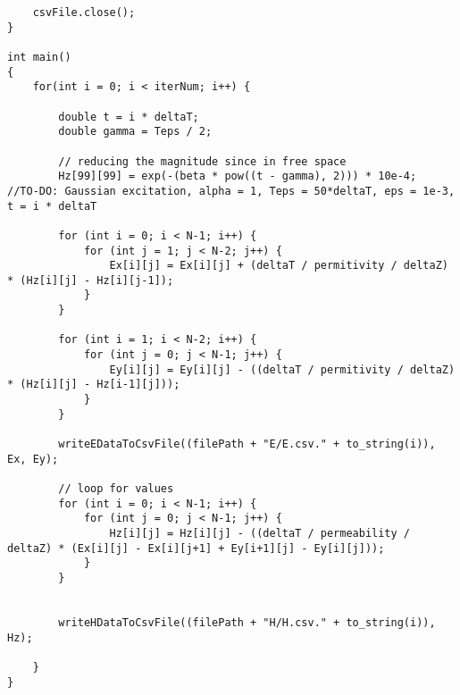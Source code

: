 \begin{verbatim}
	csvFile.close();
}

int main()
{
	for(int i = 0; i < iterNum; i++) {
		
		double t = i * deltaT;
		double gamma = Teps / 2;
		
		// reducing the magnitude since in free space
		Hz[99][99] = exp(-(beta * pow((t - gamma), 2))) * 10e-4;  //TO-DO: Gaussian excitation, alpha = 1, Teps = 50*deltaT, eps = 1e-3, t = i * deltaT
		
		for (int i = 0; i < N-1; i++) {
			for (int j = 1; j < N-2; j++) {
				Ex[i][j] = Ex[i][j] + (deltaT / permitivity / deltaZ) * (Hz[i][j] - Hz[i][j-1]);
			}
		}
		
		for (int i = 1; i < N-2; i++) {
			for (int j = 0; j < N-1; j++) {
				Ey[i][j] = Ey[i][j] - ((deltaT / permitivity / deltaZ) * (Hz[i][j] - Hz[i-1][j]));
			}
		}
		
		writeEDataToCsvFile((filePath + "E/E.csv." + to_string(i)), Ex, Ey);
		
		// loop for values
		for (int i = 0; i < N-1; i++) {
			for (int j = 0; j < N-1; j++) {
				Hz[i][j] = Hz[i][j] - ((deltaT / permeability / deltaZ) * (Ex[i][j] - Ex[i][j+1] + Ey[i+1][j] - Ey[i][j]));
			}
		}
		
		
		writeHDataToCsvFile((filePath + "H/H.csv." + to_string(i)), Hz);
		
	}
}
\end{verbatim}


